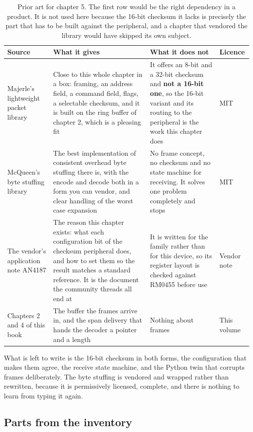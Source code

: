 \begin{table}[H]\centering\small
\begin{tabular}{p{34mm}p{46mm}p{38mm}p{20mm}}
\toprule
Source & What it gives & What it does not & Licence \\
\midrule
Majerle's lightweight packet library & Close to this whole chapter in a box: framing, an address field, a command field, flags, a selectable checksum, and it is built on the ring buffer of chapter 2, which is a pleasing fit & It offers an 8-bit and a 32-bit checksum and \textbf{not a 16-bit one}, so the 16-bit variant and its routing to the peripheral is the work this chapter does & MIT \\
McQueen's byte stuffing library & The best implementation of consistent overhead byte stuffing there is, with the encode and decode both in a form you can vendor, and clear handling of the worst case expansion & No frame concept, no checksum and no state machine for receiving. It solves one problem completely and stops & MIT \\
The vendor's application note AN4187 & The reason this chapter exists: what each configuration bit of the checksum peripheral does, and how to set them so the result matches a standard reference. It is the document the community threads all end at & It is written for the family rather than for this device, so its register layout is checked against RM0455 before use & Vendor note \\
Chapters 2 and 4 of this book & The buffer the frames arrive in, and the span delivery that hands the decoder a pointer and a length & Nothing about frames & This volume \\
\bottomrule
\end{tabular}
\caption{Prior art for chapter 5. The first row would be the right dependency in a product. It is not used here because the 16-bit checksum it lacks is precisely the part that has to be built against the peripheral, and a chapter that vendored the library would have skipped its own subject.}
\end{table}

What is left to write is the 16-bit checksum in both forms, the configuration
that makes them agree, the receive state machine, and the Python twin that
corrupts frames deliberately. The byte stuffing is vendored and wrapped rather
than rewritten, because it is permissively licensed, complete, and there is
nothing to learn from typing it again.

\subsection*{Parts from the inventory}

